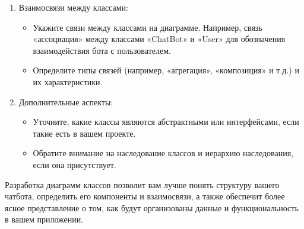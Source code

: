 \documentclass[letterpaper,10pt,russian]{sphinxmanual}
\begin{document}
\begin{enumerate}
\begin{itemize}
\end{itemize}

\item {} 
\sphinxAtStartPar
Взаимосвязи между классами:
\begin{itemize}
\item {} 
\sphinxAtStartPar
Укажите связи между классами на диаграмме. Например, связь «ассоциация» между классами «ChatBot» и «User» для обозначения взаимодействия бота с пользователем.

\item {} 
\sphinxAtStartPar
Определите типы связей (например, «агрегация», «композиция» и т.д.) и их характеристики.

\end{itemize}

\item {} 
\sphinxAtStartPar
Дополнительные аспекты:
\begin{itemize}
\item {} 
\sphinxAtStartPar
Уточните, какие классы являются абстрактными или интерфейсами, если такие есть в вашем проекте.

\item {} 
\sphinxAtStartPar
Обратите внимание на наследование классов и иерархию наследования, если она присутствует.

\end{itemize}

\end{enumerate}

\sphinxAtStartPar
Разработка диаграмм классов позволит вам лучше понять структуру вашего чат\sphinxhyphen{}бота, определить его компоненты и взаимосвязи, а также обеспечит более ясное представление о том, как будут организованы данные и функциональность в вашем приложении.
\end{document}
